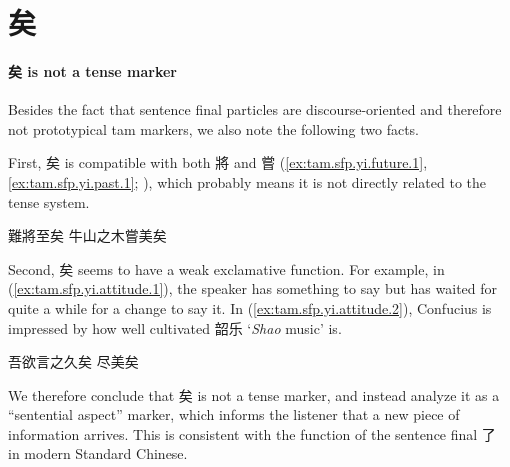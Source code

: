 \documentclass[UTF8, a4paper, oneside, scheme=plain, 12pt]{ctexrep}
\newcommand{\form}[1]{\emph{#1}}
\newcommand{\translate}[1]{`#1'}
\begin{document}
\section{矣}

\paragraph*{矣 is not a tense marker}\label{sec:sfp.yi.not-tense}

Besides the fact that sentence final particles are discourse-oriented and therefore not prototypical \ac{tam} markers,
we also note the following two facts.

First, 矣 is compatible with both 將 and 嘗 (\ref{ex:tam.sfp.yi.future.1}, \ref{ex:tam.sfp.yi.past.1}; ), which probably means it is not directly related to the tense system.

\begin{exe}
    \ex\label{ex:tam.sfp.yi.future.1} 難將至矣
    \ex\label{ex:tam.sfp.yi.past.1} 牛山之木嘗美矣
\end{exe}

Second, 矣 seems to have a weak exclamative function.
For example, in (\ref{ex:tam.sfp.yi.attitude.1}),
the speaker has something to say but has waited for quite a while for a change to say it.
In (\ref{ex:tam.sfp.yi.attitude.2}),
Confucius is impressed by how well cultivated 韶乐 \translate{\form{Shao} music} is.

\begin{exe}
    \ex\label{ex:tam.sfp.yi.attitude.1} 吾欲言之久矣
    \ex\label{ex:tam.sfp.yi.attitude.2} 尽美矣
\end{exe}

We therefore conclude that 矣 is not a tense marker,
and instead analyze it as a ``sentential aspect'' marker,
which informs the listener that a new piece of information arrives.
This is consistent with the function of the sentence final 了 in modern Standard Chinese.
\end{document}
